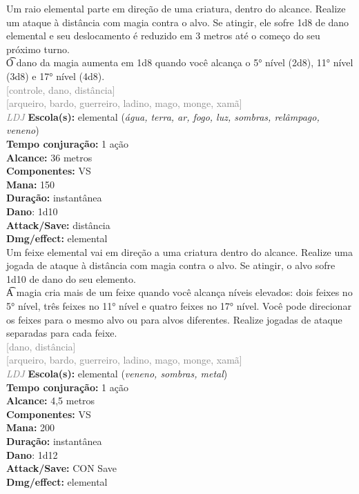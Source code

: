 \documentclass{RPG_Adventure}[2021/10/20]
\begin{document}
{\normalsize Um raio elemental parte em direção de uma criatura, dentro do alcance. Realize um ataque à distância com magia contra o alvo. Se atingir, ele sofre 1d8 de dano elemental e seu deslocamento é reduzido em 3 metros até o começo do seu próximo turno.\\\t O dano da magia aumenta em 1d8 quando você alcança o 5° nível (2d8), 11° nível (3d8) e 17° nível (4d8).\\}
{\scriptsize \textcolor{gray}{[controle, dano, distância]\\}}
{\scriptsize \textcolor{gray}{[arqueiro, bardo, guerreiro, ladino, mago, monge, xamã]\\}}
{\tiny \textcolor{gray}{\textit{LDJ}}}\jump{}
{\small \t \textbf{Escola(s):} elemental (\textit{água, terra, ar, fogo, luz, sombras, relâmpago, veneno})\\\t \textbf{Tempo conjuração:} 1 ação\\\t \textbf{Alcance:} 36 metros\\\t \textbf{Componentes:} VS\\\t \textbf{Mana:} 150\\\t \textbf{Duração:} instantânea\\\t \textbf{Dano}: 1d10\\\t \textbf{Attack/Save:} distância\\\t \textbf{Dmg/effect:} elemental\\}
{\normalsize Um feixe elemental vai em direção a uma criatura dentro do alcance. Realize uma jogada de ataque à distância com magia contra o alvo. Se atingir, o alvo sofre 1d10 de dano do seu elemento.\\\t A magia cria mais de um feixe quando você alcança níveis elevados: dois feixes no 5° nível, três feixes no 11° nível e quatro feixes no 17° nível. Você pode direcionar os feixes para o mesmo alvo ou para alvos diferentes. Realize jogadas de ataque separadas para cada feixe.\\}
{\scriptsize \textcolor{gray}{[dano, distância]\\}}
{\scriptsize \textcolor{gray}{[arqueiro, bardo, guerreiro, ladino, mago, monge, xamã]\\}}
{\tiny \textcolor{gray}{\textit{LDJ}}}\jump{}
{\small \t \textbf{Escola(s):} elemental (\textit{veneno, sombras, metal})\\\t \textbf{Tempo conjuração:} 1 ação\\\t \textbf{Alcance:} 4,5 metros\\\t \textbf{Componentes:} VS\\\t \textbf{Mana:} 200\\\t \textbf{Duração:} instantânea\\\t \textbf{Dano}: 1d12\\\t \textbf{Attack/Save:} CON Save\\\t \textbf{Dmg/effect:} elemental\\}
\end{document}
